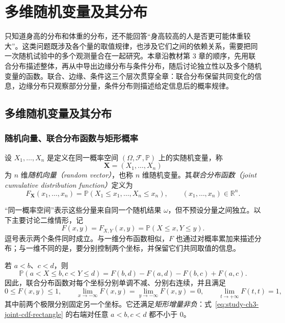 \setcounter{chapter}{2} %
\chapter{多维随机变量及其分布}
\label{chap:study-multivariate}

只知道身高的分布和体重的分布，还不能回答“身高较高的人是否更可能体重较大”。这类问题既涉及各个量的取值规律，也涉及它们之间的依赖关系，需要把同一次随机试验中的多个观测量合在一起研究。本章沿教材第 3 章的顺序，先用联合分布描述整体，再从中导出边缘分布与条件分布，随后讨论独立性以及多个随机变量的函数。联合、边缘、条件这三个层次贯穿全章：联合分布保留共同变化的信息，边缘分布只观察部分分量，条件分布则描述给定信息后的概率规律。

\section{多维随机变量及其分布}
\label{sec:study-joint-distributions}

\subsection{随机向量、联合分布函数与矩形概率}

\begin{definition}
\label{def:study-ch3-random-vector}
设 $X_1,\ldots,X_n$ 是定义在同一概率空间 $(\Omega,\mathcal F,\mathbb P)$ 上的实随机变量，称
\[
  \boldsymbol X=(X_1,\ldots,X_n)
\]
为 $n$ 维\emph{随机向量（random vector）}，也称 $n$ 维随机变量。其\emph{联合分布函数（joint cumulative distribution function）}定义为
\begin{equation}
  F_{\boldsymbol X}(x_1,\ldots,x_n)
  =\mathbb P(X_1\le x_1,\ldots,X_n\le x_n),
  \qquad (x_1,\ldots,x_n)\in\mathbb R^n.
  \label{eq:study-ch3-joint-cdf-n}
\end{equation}
\end{definition}

“同一概率空间”表示这些分量来自同一个随机结果 $\omega$，但不预设分量之间独立。以下主要讨论二维情形，记
\[
  F(x,y)=F_{X,Y}(x,y)=\mathbb P(X\le x,Y\le y).
\]
逗号表示两个条件同时成立。与一维分布函数相似，$F$ 也通过对概率累加来描述分布；与一维不同的是，要分别控制两个坐标，并保留它们共同取值的信息。

\begin{proposition}
\label{prop:study-ch3-joint-cdf-rectangle}
若 $a<b$、$c<d$，则
\begin{equation}
  \mathbb P(a<X\le b,c<Y\le d)
  =F(b,d)-F(a,d)-F(b,c)+F(a,c).
  \label{eq:study-ch3-joint-cdf-rectangle}
\end{equation}
因此，联合分布函数对每个坐标分别单调不减、分别右连续，并且满足
\[
  0\le F(x,y)\le1,\qquad
  \lim_{x\to-\infty}F(x,y)=\lim_{y\to-\infty}F(x,y)=0,
  \qquad \lim_{t\to+\infty}F(t,t)=1,
\]
其中前两个极限分别固定另一个坐标。它还满足\emph{矩形增量非负}：式~\eqref{eq:study-ch3-joint-cdf-rectangle} 的右端对任意 $a<b,c<d$ 都不小于 $0$。
\end{proposition}

